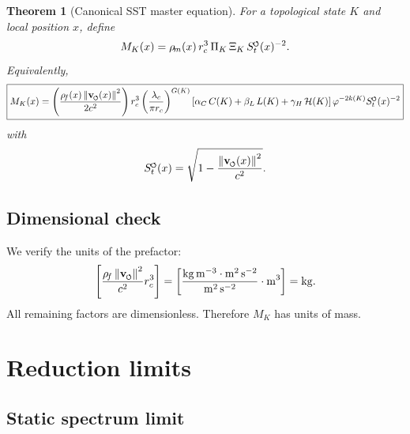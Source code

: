 \documentclass[11pt,a4paper]{article}
\newcommand{\swirlarrow}{\mathchoice{\mkern-2mu\scriptstyle\boldsymbol{\circlearrowleft}}{\mkern-2mu\scriptstyle\boldsymbol{\circlearrowleft}}{\mkern-2mu\scriptscriptstyle\boldsymbol{\circlearrowleft}}{\mkern-2mu\scriptscriptstyle\boldsymbol{\circlearrowleft}}}
\newcommand{\vswirl}{{\mathbf{v}_{\swirlarrow}}}
\newcommand{\SwirlClock}{{S_t^{\swirlarrow}}}
\newcommand{\rhoF}{\rho_{\!f}}
\newcommand{\rhoM}{\rho_{\!m}}
\providecommand{\rc}{r_c}
\newtheorem{theorem}{Theorem}
\begin{document}
            \begin{theorem}[Canonical SST master equation]
                For a topological state \(K\) and local position \(x\), define
                \begin{equation}
                    M_K(x)=\rhoM(x)\,\rc^3\,\Pi_K\,\Xi_K\,\SwirlClock(x)^{-2}.
                \end{equation}
                Equivalently,
                \begin{equation}
                    \boxed{
                        M_K(x)=
                        \left(\frac{\rhoF(x)\,\norm{\vswirl(x)}^2}{2c^2}\right)\rc^3
                        \left(\frac{\lambda_c}{\pi \rc}\right)^{G(K)}
                        \left[\alpha_C\,C(K)+\beta_L\,L(K)+\gamma_H\,\mathcal H(K)\right]
                        \varphi^{-2k(K)}
                        \SwirlClock(x)^{-2}
                    }
                \end{equation}
                with
                \begin{equation}
                    \SwirlClock(x)=\sqrt{1-\frac{\norm{\vswirl(x)}^2}{c^2}}.
                \end{equation}
            \end{theorem}
            
            \subsection*{Dimensional check}
                
                We verify the units of the prefactor:
                \begin{equation}
                    \left[\frac{\rhoF\,\norm{\vswirl}^2}{c^2}\rc^3\right]
                    =
                    \left[\frac{\mathrm{kg\,m^{-3}}\cdot \mathrm{m^2\,s^{-2}}}{\mathrm{m^2\,s^{-2}}}\cdot \mathrm{m^3}\right]
                    =
                    \mathrm{kg}.
                \end{equation}
                All remaining factors are dimensionless. Therefore \(M_K\) has units of mass.
        
        \section{Reduction limits}
            
            \subsection{Static spectrum limit}
                
\end{document}
